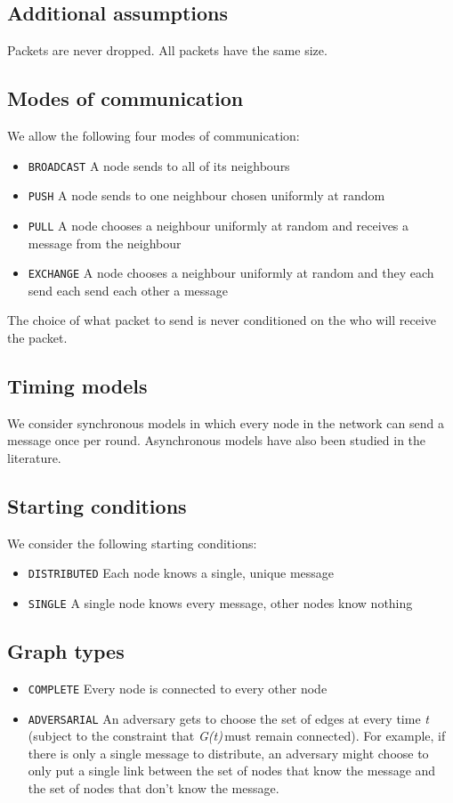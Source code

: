\documentclass{article} %
\def\graph{\textit{G(t)}\,}
\def\graphtime{\textit{t}\,}
\begin{document}
\subsection{Additional assumptions}
Packets are never dropped. All packets have the same size. 

\subsection{Modes of communication}
We allow the following four modes of communication:
\begin{itemize}
\item \texttt{BROADCAST} A node sends to all of its neighbours
\item \texttt{PUSH} A node sends to one neighbour chosen uniformly at random
\item \texttt{PULL} A node chooses a neighbour uniformly at random and receives a message from the neighbour
\item \texttt{EXCHANGE} A node chooses a neighbour uniformly at random and they each send each send each other a message
\end{itemize}
The choice of what packet to send is never conditioned on the who will receive the packet.

\subsection{Timing models}
We consider synchronous models in which every node in the network can send a message once per round. Asynchronous models have also been studied in the literature.

\subsection{Starting conditions}\label{subsec:startingconditions}
We consider the following starting conditions:
\begin{itemize}
\item \texttt{DISTRIBUTED} Each node knows a single, unique message
\item \texttt{SINGLE} A single node knows every message, other nodes know nothing
\end{itemize}

\subsection{Graph types}
\begin{itemize}
\item \texttt{COMPLETE} Every node is connected to every other node
\item \texttt{ADVERSARIAL} An adversary gets to choose the set of edges at every time \graphtime (subject to the constraint that \graph must remain connected). For example, if there is only a single message to distribute, an adversary might choose to only put a single link between the set of nodes that know the message and the set of nodes that don't know the message. 
\end{itemize}
\end{document}
